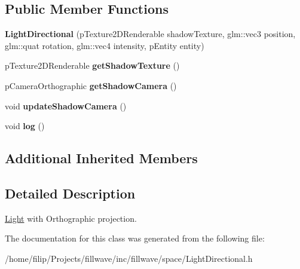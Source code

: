 \subsection*{Public Member Functions}
\begin{DoxyCompactItemize}
\item 
\hypertarget{classfillwave_1_1space_1_1LightDirectional_a4f6accd7aa58e979dcabe1532bd95016}{}{\bfseries Light\+Directional} (p\+Texture2\+D\+Renderable shadow\+Texture, glm\+::vec3 position, glm\+::quat rotation, glm\+::vec4 intensity, p\+Entity entity)\label{classfillwave_1_1space_1_1LightDirectional_a4f6accd7aa58e979dcabe1532bd95016}

\item 
\hypertarget{classfillwave_1_1space_1_1LightDirectional_a801985b17319191c36001565247a3a8e}{}p\+Texture2\+D\+Renderable {\bfseries get\+Shadow\+Texture} ()\label{classfillwave_1_1space_1_1LightDirectional_a801985b17319191c36001565247a3a8e}

\item 
\hypertarget{classfillwave_1_1space_1_1LightDirectional_ac8197dc1c53f12e3e857f1a536183f97}{}p\+Camera\+Orthographic {\bfseries get\+Shadow\+Camera} ()\label{classfillwave_1_1space_1_1LightDirectional_ac8197dc1c53f12e3e857f1a536183f97}

\item 
\hypertarget{classfillwave_1_1space_1_1LightDirectional_a639ebf20be0d085c5d29dedff5cb9cfa}{}void {\bfseries update\+Shadow\+Camera} ()\label{classfillwave_1_1space_1_1LightDirectional_a639ebf20be0d085c5d29dedff5cb9cfa}

\item 
\hypertarget{classfillwave_1_1space_1_1LightDirectional_add38e17785c8a66ffbb2a2af067f0a80}{}void {\bfseries log} ()\label{classfillwave_1_1space_1_1LightDirectional_add38e17785c8a66ffbb2a2af067f0a80}

\end{DoxyCompactItemize}
\subsection*{Additional Inherited Members}


\subsection{Detailed Description}
\hyperlink{classfillwave_1_1space_1_1Light}{Light} with Orthographic projection. 

The documentation for this class was generated from the following file\+:\begin{DoxyCompactItemize}
\item 
/home/filip/\+Projects/fillwave/inc/fillwave/space/Light\+Directional.\+h\end{DoxyCompactItemize}
